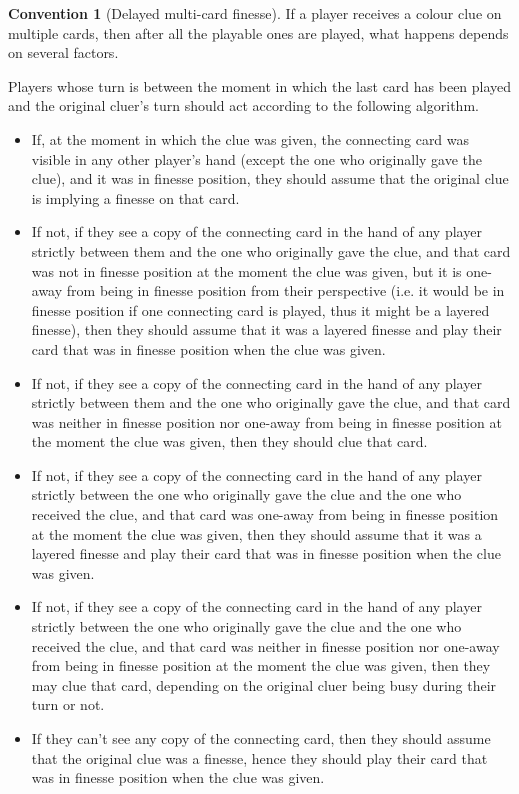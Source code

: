 \documentclass[a4paper]{article}
\theoremstyle{plain}
\theoremstyle{definition}
\newtheorem{convention}[theorem]{Convention}
\begin{document}
\begin{convention}[Delayed multi-card finesse]
	If a player receives a colour clue on multiple cards, then after all the playable ones are played, what happens depends on several factors.
	
	Players whose turn is between the moment in which the last card has been played and the original cluer's turn should act according to the following algorithm.
	
	\begin{itemize}
		\item If, at the moment in which the clue was given, the connecting card was visible in any other player's hand (except the one who originally gave the clue), and it was in finesse position, they should assume that the original clue is implying a finesse on that card.
		\item If not, if they see a copy of the connecting card in the hand of any player strictly between them and the one who originally gave the clue, and that card was not in finesse position at the moment the clue was given, but it is one-away from being in finesse position from their perspective (i.e. it would be in finesse position if one connecting card is played, thus it might be a layered finesse), then they should assume that it was a layered finesse and play their card that was in finesse position when the clue was given.
		\item If not, if they see a copy of the connecting card in the hand of any player strictly between them and the one who originally gave the clue, and that card was neither in finesse position nor one-away from being in finesse position at the moment the clue was given, then they should clue that card.
		\item If not, if they see a copy of the connecting card in the hand of any player strictly between the one who originally gave the clue and the one who received the clue, and that card was one-away from being in finesse position at the moment the clue was given, then they should assume that it was a layered finesse and play their card that was in finesse position when the clue was given.
		\item If not, if they see a copy of the connecting card in the hand of any player strictly between the one who originally gave the clue and the one who received the clue, and that card was neither in finesse position nor one-away from being in finesse position at the moment the clue was given, then they may clue that card, depending on the original cluer being busy during their turn or not.
		\item If they can't see any copy of the connecting card, then they should assume that the original clue was a finesse, hence they should play their card that was in finesse position when the clue was given.
	\end{itemize}


\end{convention}
\end{document}
